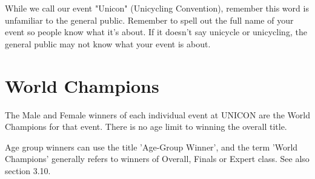 While we call our event "Unicon" (Unicycling Convention), remember this word is unfamiliar to the general public. 
Remember to spell out the full name of your event so people know what it’s about. 
If it doesn’t say unicycle or unicycling, the general public may not know what your event is about.

\section{World Champions}
The Male and Female winners of each individual event at UNICON are the World Champions for that event. 
There is no age limit to winning the overall title.

Age group winners can use the title 'Age-Group Winner', and the term 'World Champions' generally refers to winners of Overall, Finals or Expert class. 
See also section 3.10.